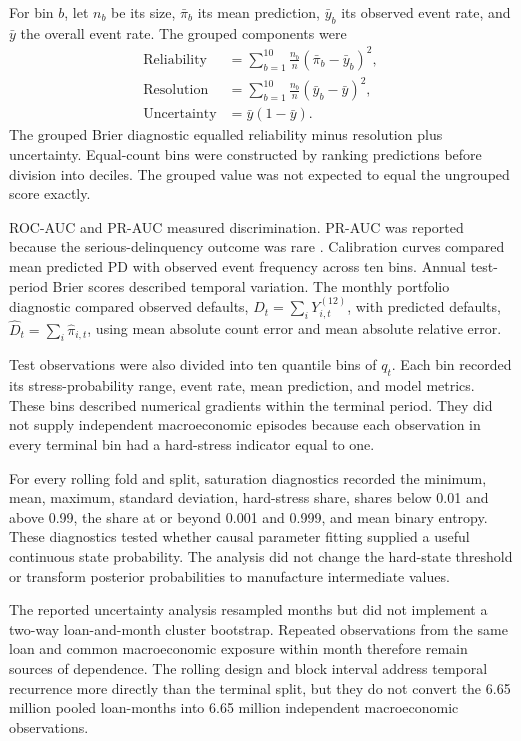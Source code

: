 For bin $b$, let $n_b$ be its size, $\bar\pi_b$ its mean prediction, $\bar y_b$ its observed event rate, and $\bar y$ the overall event rate. The grouped components were
\begin{align}
\mathrm{Reliability}&=\sum_{b=1}^{10}\frac{n_b}{n}(\bar\pi_b-\bar y_b)^2,\\
\mathrm{Resolution}&=\sum_{b=1}^{10}\frac{n_b}{n}(\bar y_b-\bar y)^2,\\
\mathrm{Uncertainty}&=\bar y(1-\bar y).
\end{align}
The grouped Brier diagnostic equalled reliability minus resolution plus uncertainty. Equal-count bins were constructed by ranking predictions before division into deciles. The grouped value was not expected to equal the ungrouped score exactly.

ROC-AUC and PR-AUC measured discrimination. PR-AUC was reported because the serious-delinquency outcome was rare \citep{davis_goadrich_2006,saito2015prroc}. Calibration curves compared mean predicted PD with observed event frequency across ten bins. Annual test-period Brier scores described temporal variation. The monthly portfolio diagnostic compared observed defaults, $D_t=\sum_iY_{i,t}^{(12)}$, with predicted defaults, $\widehat D_t=\sum_i\widehat\pi_{i,t}$, using mean absolute count error and mean absolute relative error.

Test observations were also divided into ten quantile bins of $q_t$. Each bin recorded its stress-probability range, event rate, mean prediction, and model metrics. These bins described numerical gradients within the terminal period. They did not supply independent macroeconomic episodes because each observation in every terminal bin had a hard-stress indicator equal to one.

For every rolling fold and split, saturation diagnostics recorded the minimum, mean, maximum, standard deviation, hard-stress share, shares below 0.01 and above 0.99, the share at or beyond 0.001 and 0.999, and mean binary entropy. These diagnostics tested whether causal parameter fitting supplied a useful continuous state probability. The analysis did not change the hard-state threshold or transform posterior probabilities to manufacture intermediate values.

The reported uncertainty analysis resampled months but did not implement a two-way loan-and-month cluster bootstrap. Repeated observations from the same loan and common macroeconomic exposure within month therefore remain sources of dependence. The rolling design and block interval address temporal recurrence more directly than the terminal split, but they do not convert the 6.65 million pooled loan-months into 6.65 million independent macroeconomic observations.
